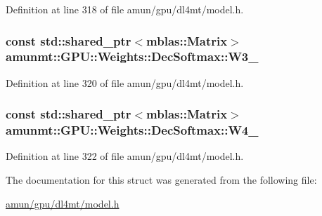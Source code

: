 Definition at line 318 of file amun/gpu/dl4mt/model.\+h.

\subsubsection[{\texorpdfstring{W3\+\_\+}{W3_}}]{\setlength{\rightskip}{0pt plus 5cm}const std\+::shared\+\_\+ptr$<${\bf mblas\+::\+Matrix}$>$ amunmt\+::\+G\+P\+U\+::\+Weights\+::\+Dec\+Softmax\+::\+W3\+\_\+}\hypertarget{structamunmt_1_1GPU_1_1Weights_1_1DecSoftmax_a26f826f4efcff85ca10f3ba3414f4020}{}\label{structamunmt_1_1GPU_1_1Weights_1_1DecSoftmax_a26f826f4efcff85ca10f3ba3414f4020}


Definition at line 320 of file amun/gpu/dl4mt/model.\+h.

\subsubsection[{\texorpdfstring{W4\+\_\+}{W4_}}]{\setlength{\rightskip}{0pt plus 5cm}const std\+::shared\+\_\+ptr$<${\bf mblas\+::\+Matrix}$>$ amunmt\+::\+G\+P\+U\+::\+Weights\+::\+Dec\+Softmax\+::\+W4\+\_\+}\hypertarget{structamunmt_1_1GPU_1_1Weights_1_1DecSoftmax_ab63526171f9ce507a531e9981aca46d4}{}\label{structamunmt_1_1GPU_1_1Weights_1_1DecSoftmax_ab63526171f9ce507a531e9981aca46d4}


Definition at line 322 of file amun/gpu/dl4mt/model.\+h.



The documentation for this struct was generated from the following file\+:\begin{DoxyCompactItemize}
\item 
\hyperlink{amun_2gpu_2dl4mt_2model_8h}{amun/gpu/dl4mt/model.\+h}\end{DoxyCompactItemize}
